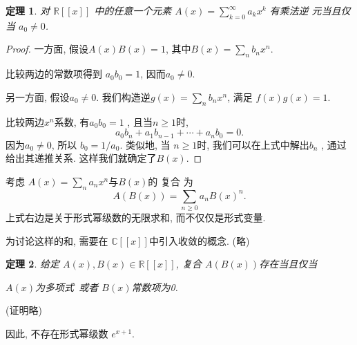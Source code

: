 \documentclass[punct]{ctexbeamer}
\newtheorem{thm}{定理}[section]
\begin{document}
\begin{frame}

\begin{thm}
对 $\mathbb{R}[[x]]$ 中的任意一个元素 $A(x)=\sum_{k=0}^{\infty} a_{k} x^{k}$ 有乘法逆 元当且仅当 $a_{0} \neq 0$.
\end{thm}
\begin{proof}
一方面, 假设$A(x) B(x)=1$, 其中$B(x)=\sum_{n} b_{n} x^{n} $.

 比较两边的常数项得到 $a_{0} b_{0}=1$, 因而$a_{0} \neq 0$.

另一方面, 假设$a_{0} \neq 0$. 我们构造逆$g(x)=\sum_{n} b_{n} x^{n}$, 满足 $f(x) g(x)=1$.

比较两边$x^{n}$系数, 有$a_{0} b_{0}=1$ , 且当$n \geq 1$时,
$$
a_{0} b_{n}+a_{1} b_{n-1}+\cdots+a_{n} b_{0}=0.
$$
因为$a_{0} \neq 0$, 所以 $b_{0}=1 / a_{0}$.
类似地, 当 $n \geq 1$时, 我们可以在上式中解出$b_{n}$ , 通过给出其递推关系.
这样我们就确定了$B(x)$.
\end{proof}
\end{frame}

\begin{frame}
考虑 $A(x)=\sum_{n} a_{n} x^{n}$与$B(x)$的\alert{ 复合} 为
$$
A(B(x))=\sum_{n \geq 0} a_{n} B(x)^{n} .
$$
上式右边是关于形式幂级数的无限求和, 而不仅仅是形式变量.


为讨论这样的和, 需要在 $\mathbb{C}[[x]]$中引入收敛的概念. (略)

\begin{thm}
    给定 $A(x), B(x) \in \mathbb{R}[[x]]$, 复合 $A(B(x))$存在当且仅当

  $A(x)$为多项式\,  或者
 $B(x)$常数项为0.
\end{thm}

(证明略)

因此, 不存在形式幂级数 $e^{x+1}$.
\end{frame}
\end{document}
